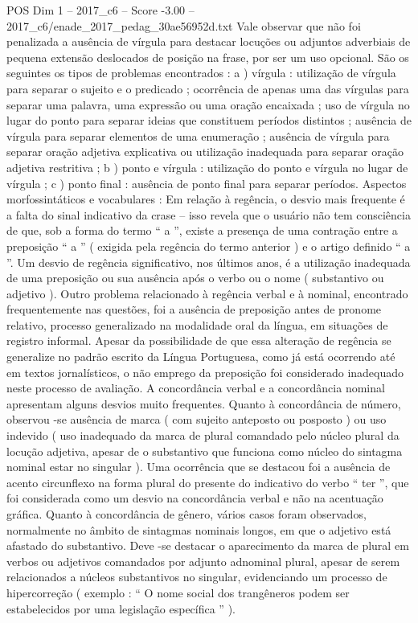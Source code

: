 \begin{textsample}{POS Dim 1 – 2017\_c6 – Score -3.00 – 2017\_c6/enade\_2017\_pedag\_30ae56952d.txt}
Vale observar que não foi penalizada a ausência de vírgula para destacar locuções ou adjuntos adverbiais de pequena extensão deslocados de posição na frase, por ser um uso opcional.
São os seguintes os tipos de problemas encontrados : a ) vírgula : utilização de vírgula para separar o sujeito e o predicado ; ocorrência de apenas uma das vírgulas para separar uma palavra, uma expressão ou uma oração encaixada ; uso de vírgula no lugar do ponto para separar ideias que constituem períodos distintos ; ausência de vírgula para separar elementos de uma enumeração ; ausência de vírgula para separar oração adjetiva explicativa ou utilização inadequada para separar oração adjetiva restritiva ; b ) ponto e vírgula : utilização do ponto e vírgula no lugar de vírgula ; c ) ponto final : ausência de ponto final para separar períodos.
Aspectos morfossintáticos e vocabulares : Em relação à regência, o desvio mais frequente é a falta do sinal indicativo da crase – isso revela que o usuário não tem consciência de que, sob a forma do termo “ a ”, existe a presença de uma contração entre a preposição “ a ” ( exigida pela regência do termo anterior ) e o artigo definido “ a ”.
Um desvio de regência significativo, nos últimos anos, é a utilização inadequada de uma preposição ou sua ausência após o verbo ou o nome ( substantivo ou adjetivo ).
Outro problema relacionado à regência verbal e à nominal, encontrado frequentemente nas questões, foi a ausência de preposição antes de pronome relativo, processo generalizado na modalidade oral da língua, em situações de registro informal.
Apesar da possibilidade de que essa alteração de regência se generalize no padrão escrito da Língua Portuguesa, como já está ocorrendo até em textos jornalísticos, o não emprego da preposição foi considerado inadequado neste processo de avaliação.
A concordância verbal e a concordância nominal apresentam alguns desvios muito frequentes.
Quanto à concordância de número, observou -se ausência de marca ( com sujeito anteposto ou posposto ) ou uso indevido ( uso inadequado da marca de plural comandado pelo núcleo plural da locução adjetiva, apesar de o substantivo que funciona como núcleo do sintagma nominal estar no singular ).
Uma ocorrência que se destacou foi a ausência de acento circunflexo na forma plural do presente do indicativo do verbo “ ter ”, que foi considerada como um desvio na concordância verbal e não na acentuação gráfica.
Quanto à concordância de gênero, vários casos foram observados, normalmente no âmbito de sintagmas nominais longos, em que o adjetivo está afastado do substantivo.
Deve -se destacar o aparecimento da marca de plural em verbos ou adjetivos comandados por adjunto adnominal plural, apesar de serem relacionados a núcleos substantivos no singular, evidenciando um processo de hipercorreção ( exemplo : “ O nome social dos trangêneros podem ser estabelecidos por uma legislação específica ” ).

\end{textsample}

